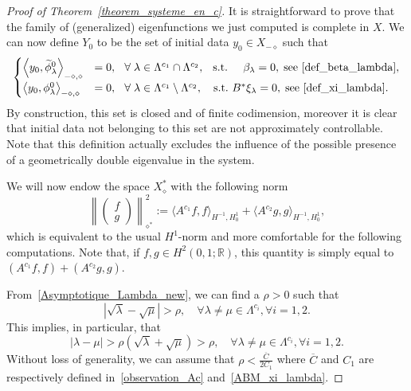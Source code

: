 \documentclass[11pt]{article}
\theoremstyle{definition}
\numberwithin{equation}{section}
\numberwithin{figure}{section}
\numberwithin{table}{section}
\newcommand{\Xalphas}{X_\diamond^*}
\newcommand{\Xmalpha}{X_{-\diamond}}
\newcommand{\Fzp}{Y_0}
\newcommand{\normeXalphas}[1]{\left\| #1 \right\|_{\diamond^*}}
\newcommand{\dual}[2]{\left\langle #1, #2 \right\rangle_{-\diamond,\diamond}}
\newcommand{\R}{\mathbb{R}}
\let\oldtilde\tilde
\renewcommand*{\tilde}[1]{\mathchoice{\widetilde{#1}}{\widetilde{#1}}{\oldtilde{#1}}{\oldtilde{#1}}}\let\oldexists\exists
\renewcommand*{\exists}{\mathrel{\oldexists}}
\let\oldforall\forall
\renewcommand*{\forall}{\mathrel{\oldforall}}
\begin{document}
\begin{proof}[Proof of Theorem~\ref{theorem_systeme_en_c}]
It is straightforward to prove that the family of (generalized) eigenfunctions we just computed is complete in $X$. We can now define $\Fzp$ to be the set of initial data $y_0\in \Xmalpha$ such that
\begin{equation}\label{conditions_Y0}
\begin{cases}
\dual{y_0}{\tilde{\phi}^0_\lambda} & = 0, \mkern13mu \forall \lambda\in \Lambda^{c_1}\cap \Lambda^{c_2}, \mkern14mu\text{s.t.} \mkern25mu \beta_\lambda=0, \; \text{see~\eqref{def_beta_lambda}},\\[0.15em] 
\dual{y_0}{\phi_\lambda^0} & = 0, \ \mkern7mu \forall \lambda\in \Lambda^{c_1}\setminus \Lambda^{c_2}, \quad\text{s.t.} \ B^* \xi_\lambda=0, \; \text{see~\eqref{def_xi_lambda}}.
\end{cases}
\end{equation}
By construction, this set is closed and of finite codimension, moreover it is clear that initial data not belonging to this set are not approximately controllable. Note that this definition actually excludes the influence of the possible presence of a geometrically double eigenvalue in the system.



We will now endow the space $\Xalphas$ with the following norm
\[
\normeXalphas{
\begin{pmatrix} f \\ g
\end{pmatrix}}^2 := \langle A^{c_1} f,f\rangle_{H^{-1},H^1_0} + \langle A^{c_2} g,g\rangle_{H^{-1},H^1_0},
\]
which is equivalent to the usual $H^1$-norm and more comfortable for the following computations. Note that, if $f,g\in H^2(0,1 ; \R)$, this quantity is simply equal to $(A^{c_1} f,f) + (A^{c_2}g,g)$.


From~\eqref{Asymptotique_Lambda_new}, we can find a $\rho>0$ such that
\[
\left|\sqrt{\lambda}-\sqrt{\mu}\right| > \rho, \quad\forall \lambda\neq \mu \in \Lambda^{c_i}, \forall i=1,2.
\]
This implies, in particular, that
\begin{equation}\label{gap_potentiel}
|\lambda-\mu| > \rho \left(\sqrt{\lambda}+\sqrt{\mu}\right) > \rho, \quad \forall \lambda\neq \mu \in \Lambda^{c_i}, \forall i=1,2.
\end{equation}
Without loss of generality, we can assume that $\rho < \frac{\overline{C}}{2 C_1}$ where $\overline{C}$ and $C_1$ are respectively defined in~\eqref{observation_Ac} and~\eqref{ABM_xi_lambda}.


\end{proof}
\end{document}
